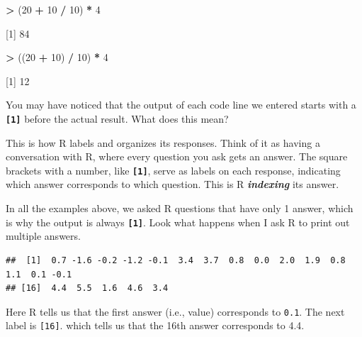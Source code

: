 \documentclass[
]{book}
\newenvironment{Shaded}{\begin{snugshade}}{\end{snugshade}}
\newcommand{\CommentTok}[1]{\textcolor[rgb]{0.56,0.35,0.01}{\textit{#1}}}
\newcommand{\DecValTok}[1]{\textcolor[rgb]{0.00,0.00,0.81}{#1}}
\newcommand{\FunctionTok}[1]{\textcolor[rgb]{0.13,0.29,0.53}{\textbf{#1}}}
\newcommand{\NormalTok}[1]{#1}
\newcommand{\SpecialCharTok}[1]{\textcolor[rgb]{0.81,0.36,0.00}{\textbf{#1}}}
\begin{document}
\begin{Shaded}
\begin{Highlighting}[]
\SpecialCharTok{\textgreater{}}\NormalTok{ (}\DecValTok{20} \SpecialCharTok{+} \DecValTok{10} \SpecialCharTok{/} \DecValTok{10}\NormalTok{) }\SpecialCharTok{*} \DecValTok{4} 

\NormalTok{[}\DecValTok{1}\NormalTok{] }\DecValTok{84}

\SpecialCharTok{\textgreater{}}\NormalTok{ ((}\DecValTok{20} \SpecialCharTok{+} \DecValTok{10}\NormalTok{) }\SpecialCharTok{/} \DecValTok{10}\NormalTok{) }\SpecialCharTok{*} \DecValTok{4}

\NormalTok{[}\DecValTok{1}\NormalTok{] }\DecValTok{12}
\end{Highlighting}
\end{Shaded}

You may have noticed that the output of each code line we entered starts with a \textbf{\texttt{{[}1{]}}} before the actual result. What does this mean?

This is how R labels and organizes its responses. Think of it as having a conversation with R, where every question you ask gets an answer. The square brackets with a number, like \textbf{\texttt{{[}1{]}}}, serve as labels on each response, indicating which answer corresponds to which question. This is R \textbf{\emph{indexing}} its answer.

In all the examples above, we asked R questions that have only 1 answer, which is why the output is always \textbf{\texttt{{[}1{]}}}. Look what happens when I ask R to print out multiple answers.

\begin{Shaded}
\end{Shaded}

\begin{verbatim}
##  [1]  0.7 -1.6 -0.2 -1.2 -0.1  3.4  3.7  0.8  0.0  2.0  1.9  0.8  1.1  0.1 -0.1
## [16]  4.4  5.5  1.6  4.6  3.4
\end{verbatim}

Here R tells us that the first answer (i.e., value) corresponds to \texttt{0.1}. The next label is \texttt{{[}16{]}}. which tells us that the 16th answer corresponds to 4.4.
\end{document}
